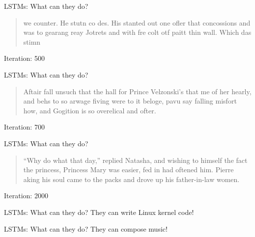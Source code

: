 \begin{slide}{LSTMs: What can they do?}
  \begin{quote}
    we counter. He stutn co des. His stanted out one ofler that concossions and was to gearang reay Jotrets and with fre colt otf paitt thin wall. Which das stimn
  \end{quote}
  \vspace{0.25cm}
  Iteration: 500
\begin{flushleft}\cite{lstm}\end{flushleft}
\end{slide}

\begin{slide}{LSTMs: What can they do?}
  \begin{quote}
    Aftair fall unsuch that the hall for Prince Velzonski's that me of
    her hearly, and behs to so arwage fiving were to it beloge, pavu say falling misfort
    how, and Gogition is so overelical and ofter.
  \end{quote}
  \vspace{0.25cm}
  Iteration: 700
\begin{flushleft}\cite{lstm}\end{flushleft}
\end{slide}

\begin{slide}{LSTMs: What can they do?}
  \begin{quote}
    ``Why do what that day,'' replied Natasha, and wishing to himself the fact the princess, Princess Mary was easier, fed in had oftened him. Pierre aking his soul came to the packs and drove up his father-in-law women.
  \end{quote}
  \vspace{0.25cm}
  Iteration: 2000
\begin{flushleft}\cite{lstm}\end{flushleft}
\end{slide}

\begin{slide}{LSTMs: What can they do?}
  {
    \huge
    They can write Linux kernel code!
  }
\end{slide}

\begin{slide}{LSTMs: What can they do?}
  {
    \huge
    They can compose music!
  }
\end{slide}

